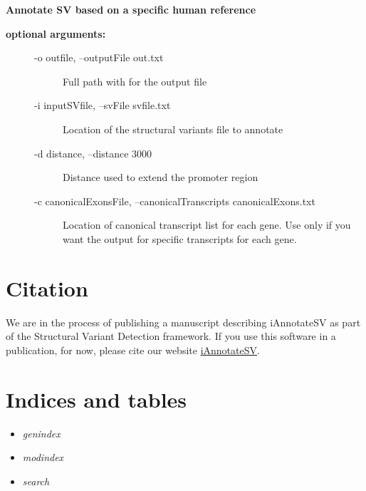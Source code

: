 \documentclass[letterpaper,10pt,english]{sphinxmanual}
\begin{document}
\textbf{Annotate SV based on a specific human reference}
\begin{description}
\item[{\textbf{optional arguments:}}] \leavevmode{}
\begin{description}
\item[{-o outfile, --outputFile out.txt}] \leavevmode
Full path with for the output file

\item[{-i inputSVfile, --svFile svfile.txt}] \leavevmode
Location of the structural variants file to annotate

\item[{-d distance, --distance 3000}] \leavevmode
Distance used to extend the promoter region

\end{description}
\begin{description}
\item[{-c canonicalExonsFile, --canonicalTranscripts canonicalExons.txt}] \leavevmode
Location of canonical transcript list for each gene.
Use only if you want the output for specific
transcripts for each gene.

\end{description}

\end{description}


\chapter{Citation}
\label{index:citation}
We are in the process of publishing a manuscript describing iAnnotateSV as part of the Structural Variant Detection framework.
If you use this software in a publication, for now, please cite our website \href{http://github.com/rhshah/iAnnotateSV}{iAnnotateSV}.


\chapter{Indices and tables}
\label{index:indices-and-tables}\begin{itemize}
\item {} 
\emph{genindex}

\item {} 
\emph{modindex}

\item {} 
\emph{search}

\end{itemize}



\renewcommand{\indexname}{Index}
\printindex
\end{document}
